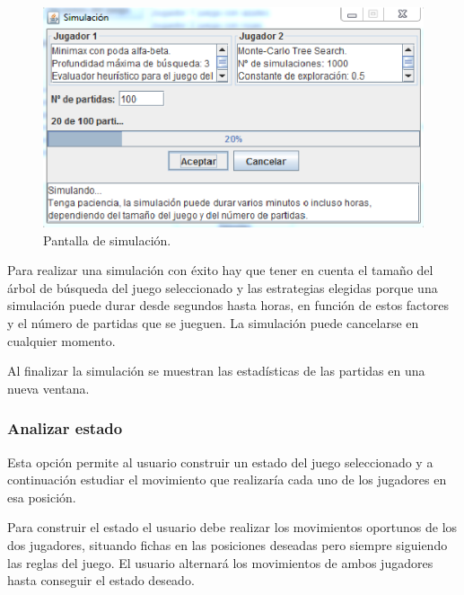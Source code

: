 \begin{figure}[!h]
	\centering
	\includegraphics[scale=0.5]{contenido/apendiceA/imagenes/ventanaSimulacion.eps}
	\caption{Pantalla de simulación.}
	\label{fig:ventana_simulacion}
\end{figure}

Para realizar una simulación con éxito hay que tener en cuenta el tamaño del árbol de búsqueda del juego seleccionado y las estrategias elegidas porque una simulación puede durar desde segundos hasta horas, en función de estos factores y el número de partidas que se jueguen.
La simulación puede cancelarse en cualquier momento.

Al finalizar la simulación se muestran las estadísticas de las partidas en una nueva ventana.

\subsubsection{Analizar estado}
\label{sssec:analizar_estado}
Esta opción permite al usuario construir un estado del juego seleccionado y a continuación estudiar el movimiento que realizaría cada uno de los jugadores en esa posición.

Para construir el estado el usuario debe realizar los movimientos oportunos de los dos jugadores, situando fichas en las posiciones deseadas pero siempre siguiendo las reglas del juego.
El usuario alternará los movimientos de ambos jugadores hasta conseguir el estado deseado.

